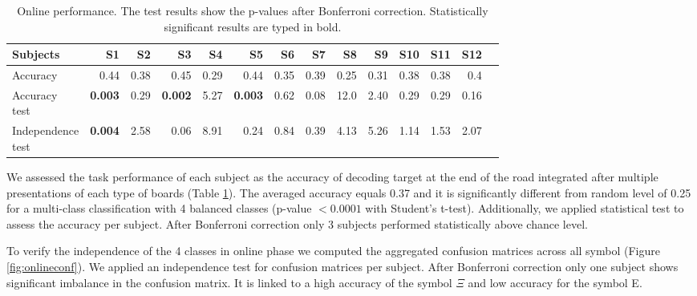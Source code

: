 \documentclass[12pt]{iopart}
\begin{document}
\begin{table}
    \centering
    \caption{Online performance. The test results show the p-values after Bonferroni correction.
    Statistically significant results are typed in bold.}
    \scriptsize
    \renewcommand{\arraystretch}{1.5}
    \begin{tabular}{l r r r r r r r r r r r r r}
        \hline
        Subjects & S1 & S2 & S3 & S4 & S5 & S6 & S7 & S8 & S9 & S10 & S11 & S12 \\
        \hline

        Accuracy & 0.44 & 0.38 & 0.45 & 0.29 & 0.44 & 0.35 & 0.39 & 0.25 & 0.31 & 0.38 & 0.38 & 0.4 \\ 
        \shortstack{Accuracy \\ test} & \textbf{0.003} & 0.29 & \textbf{0.002} & 5.27 & \textbf{0.003} & 0.62 & 0.08 & 12.0 & 2.40 & 0.29 & 0.29 &
        0.16 \\
        \shortstack{Independence \\ test}  & \textbf{ 0.004} & 2.58 & 0.06 & 8.91 & 0.24 & 0.84 & 0.39 & 4.13 & 5.26 & 1.14 & 1.53
        & 2.07 \\
        \hline
    \end{tabular}
    \label{tab:onlineperf}
\end{table}

We assessed the task performance of each subject as the accuracy of
decoding target at the end of the road integrated after multiple presentations
of each type of boards (Table \ref{tab:onlineperf}).
The averaged accuracy 
equals 0.37 and it is significantly different from random level of 0.25 for
a multi-class classification with 4 balanced classes (p-value $< 0.0001$ with Student's t-test).
Additionally, we applied statistical test to assess the accuracy per subject.
After Bonferroni correction only 3 subjects performed statistically above chance level.

To verify the independence of the 4 classes in online phase
we computed the aggregated confusion matrices across all symbol (Figure \ref{fig:onlineconf}).
We applied an independence test for confusion matrices per subject.
After Bonferroni correction only one subject shows significant imbalance in the
confusion matrix. It is linked to a high accuracy of the symbol $\Xi$ and low accuracy 
for the symbol E.
\end{document}
